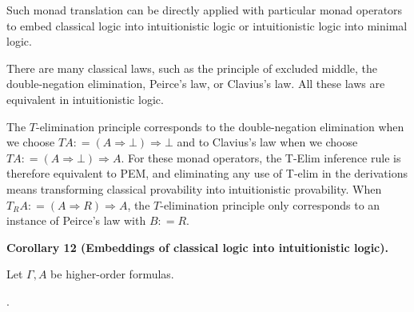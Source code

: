 \documentclass[10pt,a4paper]{article}
\begin{document}
 
Such monad translation can be directly applied with particular monad operators to embed classical logic into intuitionistic logic or intuitionistic logic into minimal logic.\par
 
 
 
There are many classical laws, such as the principle of excluded middle, the double-negation elimination, Peirce’s law, or Clavius’s law. All these laws are equivalent in intuitionistic logic.\par
 
\begin{center}\end{center}
 
The $T$-elimination principle corresponds to the double-negation elimination when we choose $TA\mathrel{\mathop{:}}=(A\mathbin{\Rightarrow}\bot)\mathbin{\Rightarrow}\bot$ and to Clavius’s law when we choose $TA\mathrel{\mathop{:}}=(A\mathbin{\Rightarrow}\bot)\mathbin{\Rightarrow}A$. For these monad operators, the T-Elim inference rule is therefore equivalent to PEM, and eliminating any use of T-elim in the derivations means transforming classical provability into intuitionistic provability. When $T_{R}A\mathrel{\mathop{:}}=(A\mathbin{\Rightarrow}R)\mathbin{\Rightarrow}A$, the $T$-elimination principle only corresponds to an instance of Peirce’s law with $B\mathrel{\mathop{:}}=R$.\par
 
 
 
\par\medskip\noindent\textbf{Corollary 12 (Embeddings of classical logic into intuitionistic logic).}\par
 
 
Let $\Gamma,A$ be higher-order formulas.\par
  
\par{}. 
 
\end{document}
